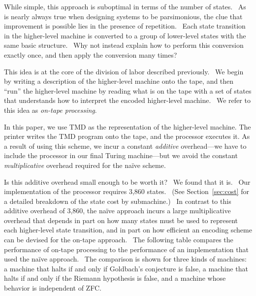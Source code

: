 \documentclass[11pt]{article}
\begin{document}
While simple, this approach is suboptimal in terms of the number of states. \ As is nearly always true when designing systems to be parsimonious, the clue that improvement is possible lies in the presence of repetition. \ Each state transition in the higher-level machine is converted to a group of lower-level states with the same basic structure. \ Why not instead explain how to perform this conversion exactly once, and then apply the conversion many times?

This idea is at the core of the division of labor described previously. \ We begin by writing a description of the higher-level machine onto the tape, and then ``run'' the higher-level machine by reading what is on the tape with a set of states that understands how to interpret the encoded higher-level machine. \ We refer to this idea as \emph{on-tape processing}.

In this paper, we use TMD as the representation of the higher-level machine.\footnotemark
{}
The printer writes the TMD program onto the tape, and the processor executes it. As a result of using this scheme, we incur a constant \emph{additive} overhead---we have to include the processor in our final Turing machine---but we avoid the constant \emph{multiplicative} overhead required for the na\"ive scheme.

Is this additive overhead small enough to be worth it? \ We found that it is. \ Our implementation of the processor requires 3,860 states. \ (See Section~\ref{sec:cost} for a detailed breakdown of the state cost by submachine.) \ In contrast to this additive overhead of 3,860, the na\"ive approach incurs a large multiplicative overhead that depends in part on how many states must be used to represent each higher-level state transition, and in part on how efficient an encoding scheme can be devised for the on-tape approach. \ The following table compares the performance of on-tape processing to the performance of an implementation that used the na\"ive approach. \ The comparison is shown for three kinds of machines: a machine that halts if and only if Goldbach's conjecture is false, a machine that halts if and only if the Riemann hypothesis is false, and a machine whose behavior is independent of ZFC.
\end{document}
